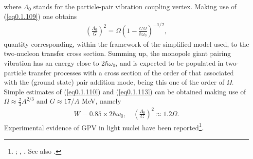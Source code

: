 where $\Lambda_0$ stands for the particle-pair vibration coupling vertex. Making use of (\ref{eq0.1.109}) one obtains
\begin{align}\label{eq0.1.113}
\left(\frac{\Lambda_0}{G}\right)^2=\Omega\left(1-\frac{G\Omega}{\hbar\omega_0}\right)^{-1/2},
\end{align}
quantity corresponding, within the framework of the simplified model used, to the two-nucleon transfer cross section. Summing up, the monopole giant pairing vibration has an energy close to $2\hbar\omega_0$, and is expected to be populated in two-particle transfer processes with a cross section of the order of that associated with the (ground state) pair addition mode, being this one of the order of $\Omega$. Simple estimates of (\ref{eq0.1.110}) and (\ref{eq0.1.113}) can be obtained making use of $\Omega\approx\frac{2}{3}A^{2/3}$
and $G\approx17/A$ MeV, namely 
\begin{align}\label{eq0.1.114}
W=0.85\times2\hbar\omega_0,\quad\left(\frac{\Lambda_0}{G}\right)^2\approx1.2 \Omega.
\end{align}
Experimental evidence of GPV in light nuclei have been reported\footnote{\cite{Cappuzzello:15}; \cite{Cavallaro:19},  \cite{Bortignon:16}. See also \cite{Laskin:16,Betan:02,Dussel:09,Mouginot:11,Khan:04,Avez:08,Khan:09,Dasso:15,Fortunato:02,Herzog:86,Betan:02}.}.
